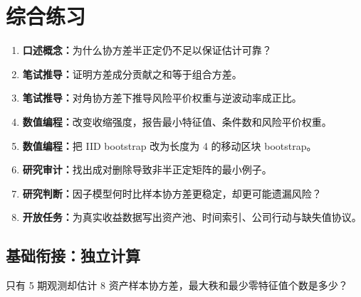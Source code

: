 \section{综合练习}
\begin{enumerate}[leftmargin=*]
  \item \textbf{口述概念：}为什么协方差半正定仍不足以保证估计可靠？
  \item \textbf{笔试推导：}证明方差成分贡献之和等于组合方差。
  \item \textbf{笔试推导：}对角协方差下推导风险平价权重与逆波动率成正比。
  \item \textbf{数值编程：}改变收缩强度，报告最小特征值、条件数和风险平价权重。
  \item \textbf{数值编程：}把 IID bootstrap 改为长度为 4 的移动区块 bootstrap。
  \item \textbf{研究审计：}找出成对删除导致非半正定矩阵的最小例子。
  \item \textbf{研究判断：}因子模型何时比样本协方差更稳定，却更可能遗漏风险？
  \item \textbf{开放任务：}为真实收益数据写出资产池、时间索引、公司行动与缺失值协议。
\end{enumerate}

\subsection*{基础衔接：独立计算}
只有 5 期观测却估计 8 资产样本协方差，最大秩和最少零特征值个数是多少？
